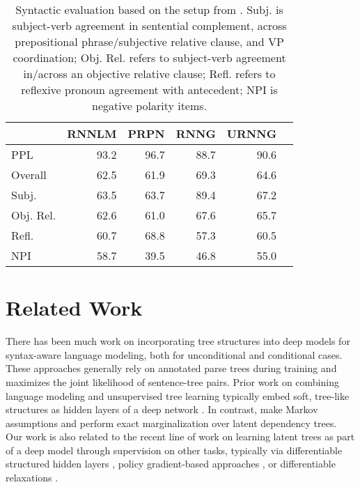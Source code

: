 \documentclass[11pt,a4paper]{article}
\begin{document}
\begin{table}[t]
    \small
    \centering
    \begin{tabular}{l r r r r r}
    \toprule
    & RNNLM & PRPN & RNNG & URNNG \\
    \midrule
 PPL & 93.2 & 96.7 & 88.7 & 90.6 \\
 \midrule
 Overall & 62.5 & 61.9& 69.3 & 64.6 \\
  Subj. & 63.5 & 63.7& 89.4 & 67.2 \\
  Obj. Rel.& 62.6 & 61.0& 67.6 & 65.7 \\
  Refl. & 60.7 & 68.8& 57.3 & 60.5 \\
  NPI & 58.7 & 39.5& 46.8 & 55.0 \\

 \bottomrule
    \end{tabular}
        \vspace{-2mm}
    \caption{Syntactic evaluation based on the setup from \citet{marvin2018syntax}. Subj. is subject-verb agreement in sentential complement, across prepositional phrase/subjective relative clause, and VP coordination; Obj. Rel. refers to subject-verb agreement in/across an objective relative clause; Refl. refers to reflexive pronoun agreement with antecedent; NPI is negative polarity items.}
    \label{tab:syntax}
          \vspace{-2mm}
\end{table}
\vspace{-3mm}
\section{Related Work}
\vspace{-2mm}
There has been much work on incorporating tree structures into deep models for syntax-aware language modeling, both for unconditional \cite{emami2005nslm,buys2015gen,dyer2016rnng} and conditional \cite{yin2017syntax,melis2017drnn,rabinovich2017asn,aharoni2017tree,eriguchi2017nmt,wang2018treenmt,gu2018topdown} cases. These approaches generally rely on annotated parse trees during training and maximizes the joint
 likelihood of sentence-tree pairs. Prior work
 on combining language modeling and unsupervised tree learning typically
 embed soft, tree-like structures as hidden layers of a deep network \cite{cho2014prop,chung2017hier,shen2018nlm,shen2019ordered}. In contrast, \citet{buys2018syntax} make Markov assumptions and perform exact marginalization over latent dependency trees. Our work is also related to the recent line of work on learning latent trees as part of a deep model through supervision on other tasks, typically via differentiable structured hidden layers \cite{kim2017struct,bradbury2017nmt,liu2018struct,tran2018nmt,peng2018spigot,niculae2018dynamic,liu2018structalign}, 
 policy gradient-based approaches \cite{yogatama2017learning,williams2018latent,havrylov2019}, or differentiable relaxations \cite{choi2018learning,maillard2018latent}.
\end{document}
